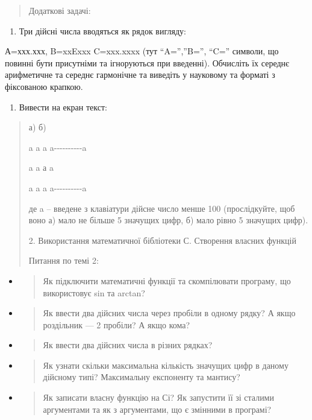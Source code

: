 \documentclass[]{article}
\begin{document}
\begin{quote}
Додаткові задачі:
\end{quote}

\begin{enumerate}
\def\labelenumi{\arabic{enumi}.}
\item
  Три дійсні числа вводяться як рядок вигляду:
\end{enumerate}

А=ххх.ххх, B=xxExxx C=xxx.xxxx (тут ``A='',''B='', ``C='' символи, що
повинні бути присутніми та ігноруються при введенні). Обчисліть їх
середнє арифметичне та середнє гармонічне та виведіть у науковому та
форматі з фіксованою крапкою.

\begin{enumerate}
\def\labelenumi{\arabic{enumi}.}
\item
  Вивести на екран текст:
\end{enumerate}

\begin{quote}
а) б)

a a a a-\/-\/-\/-\/-\/-\/-\/-\/-\/-a

a a а \textbar{} a \textbar{}

a a a a-\/-\/-\/-\/-\/-\/-\/-\/-\/-a

де a -- введене з клавіатури дійсне число менше 100 (прослідкуйте, щоб
воно а) мало не більше 5 значущих цифр, б) мало рівно 5 значущих цифр).

2. Використання математичної бібліотеки С. Створення власних функцій

Питання по темі 2:
\end{quote}

\begin{itemize}
\item
  \begin{quote}
  Як підключити математичні функції та скомпілювати програму, що
  використовує sin та arctan?
  \end{quote}
\item
  \begin{quote}
  Як ввести два дійсних числа через пробіли в одному рядку? А якщо
  роздільник --- 2 пробіли? А якщо кома?
  \end{quote}
\end{itemize}

\begin{itemize}
\item
  \begin{quote}
  Як ввести два дійсних числа в різних рядках?
  \end{quote}
\item
  \begin{quote}
  Як узнати скільки максимальна кількість значущих цифр в даному
  дійсному типі? Максимальну експоненту та мантису?
  \end{quote}
\item
  \begin{quote}
  Як записати власну функцію на Сі? Як запустити її зі сталими
  аргументами та як з аргументами, що є змінними в програмі?
  \end{quote}
\end{itemize}
\end{document}
